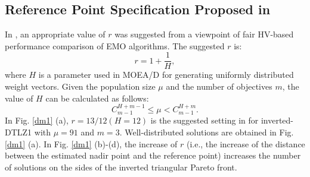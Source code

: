 \documentclass[conference]{IEEEtran}
\begin{document}
\subsection{Reference Point Specification Proposed in \cite{hisao:RPhowtoSpecify}}
In \cite{hisao:RPexplanation, hisao:RPhowtoSpecify, hisao:RPspecify}, 
an appropriate value of $r$ was suggested from a viewpoint of fair HV-based performance comparison of EMO algorithms. 
The suggested $r$ is: 
\begin{equation}\label{eod}
  r=1+\frac{1}{H},
\end{equation}
where $H$ is a parameter used in MOEA/D\cite{MOEAD} for 
generating uniformly distributed weight vectors\cite{hisao:dynamic}. 
Given the population size $\mu$ and the number of objectives $m$, the value of $H$ can be calculated as follows:
\begin{equation}
  C_{m-1}^{H+m-1} \leq \mu < C_{m-1}^{H+m}.
\end{equation}
In Fig. \ref{dm1} (a), $r=13/12 (H=12)$ is the suggested setting in \cite{hisao:RPhowtoSpecify} for inverted-DTLZ1 with $\mu = 91$ and $m = 3$.
Well-distributed solutions are obtained in Fig. \ref{dm1} (a). 
In Fig. \ref{dm1} (b)-(d), the increase of $r$ 
(i.e., the increase of the distance between the estimated nadir point and the reference point) 
increases the number of solutions on the sides of the inverted triangular Pareto front.
\end{document}
